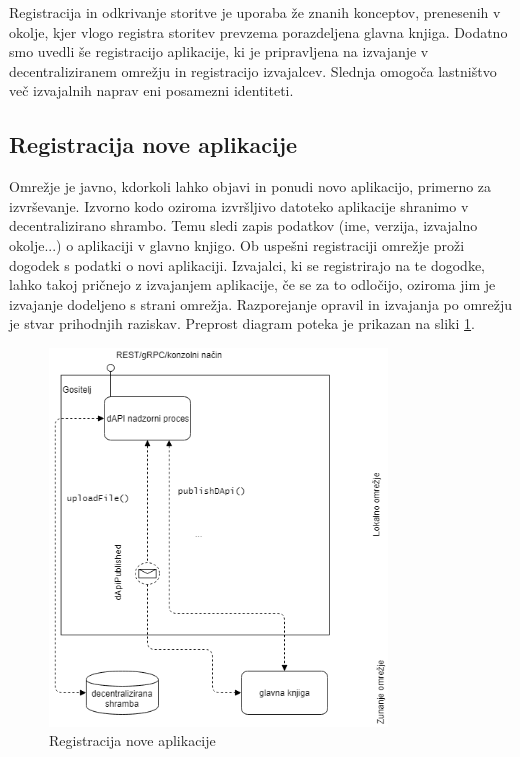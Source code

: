 \documentclass[a4paper, 12pt]{book}
\begin{document}
Registracija in odkrivanje storitve je uporaba že znanih konceptov, prenesenih v okolje, kjer vlogo registra storitev prevzema porazdeljena glavna knjiga.
Dodatno smo uvedli še registracijo aplikacije, ki je pripravljena na izvajanje v decentraliziranem omrežju in registracijo izvajalcev.
Slednja omogoča lastništvo več izvajalnih naprav eni posamezni identiteti.


\subsection{Registracija nove aplikacije}
\label{registerService}

Omrežje je javno, kdorkoli lahko objavi in ponudi novo aplikacijo, primerno za izvrševanje.
Izvorno kodo oziroma izvršljivo datoteko aplikacije shranimo v decentralizirano shrambo.
Temu sledi zapis podatkov (ime, verzija, izvajalno okolje...) o aplikaciji v glavno knjigo.
Ob uspešni registraciji omrežje proži dogodek s podatki o novi aplikaciji.
Izvajalci, ki se registrirajo na te dogodke, lahko takoj pričnejo z izvajanjem aplikacije, če se za to odločijo, oziroma jim je izvajanje dodeljeno s strani omrežja.
Razporejanje opravil in izvajanja po omrežju je stvar prihodnjih raziskav.
Preprost diagram poteka je prikazan na sliki \ref{register_api}.

\begin{figure}[h]
	\centering
	\includegraphics[width=0.8\textwidth]{slike/register_api.png}
	\caption{Registracija nove aplikacije}
	\label{register_api}
\end{figure}
\end{document}
